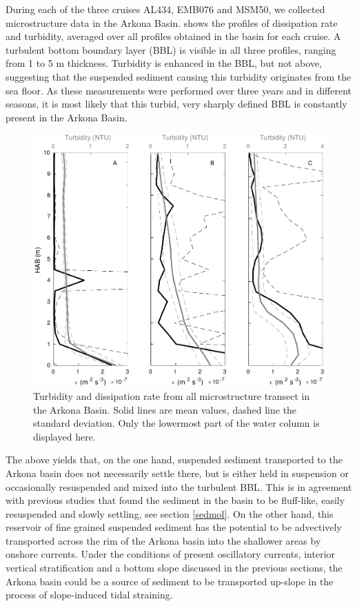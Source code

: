  During each of the three cruises AL434, EMB076 and MSM50, we collected 
microstructure data in the Arkona Basin.  shows the profiles of 
dissipation rate and turbidity, averaged over all profiles obtained in the 
basin for each cruise. A turbulent bottom boundary layer (BBL) is visible in 
all three profiles, ranging from 1 to 5 m thickness. 
Turbidity is enhanced in the BBL, but not above, suggesting that the suspended 
sediment causing this turbidity originates from the sea floor. As these 
measurements were performed over three years and in different 
seasons, it is most likely that this turbid, very sharply defined BBL is 
constantly present in the Arkona Basin.

   \begin{figure}[ht]
\includegraphics[width=15cm]{bilder/arkona_mss.pdf}
 \caption{Turbidity and dissipation rate from all microstructure transect in 
the Arkona Basin. Solid lines are mean values, dashed line the standard 
deviation. Only the lowermost part of the water column is displayed here.}
 \label{abmss}
 \end{figure}

The above yields that, on the one hand, suspended sediment transported to the 
Arkona basin does not necessarily settle there, but is either held in 
suspension or occasionally resuspended and mixed into the turbulent BBL. This 
is in agreement with previous studies that found the sediment in the basin to 
be fluff-like, easily resuspended and slowly settling, see section 
\ref{sedmol}. On the other hand, this reservoir of fine grained 
suspended sediment has the potential to be advectively 
transported across the rim of the Arkona basin into the shallower areas by 
onshore currents. Under the conditions of present oscillatory currents, 
interior vertical stratification and a bottom slope discussed in the previous 
sections, the Arkona basin could be a source of sediment to be transported 
up-slope in the process of slope-induced tidal straining.


